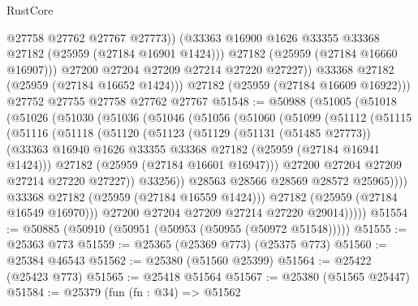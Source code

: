 \begin{lexlean}{RustCore}
\begin{coremodule}
                  @27758
                  @27762
                  @27767
                  @27773))
              (@33363 @16900 @1626 @33355 @33368 @27182 (@25959 (@27184 @16901 @1424)))
              @27182
              (@25959 (@27184 @16660 @16907)))
            @27200
            @27204
            @27209
            @27214
            @27220
            @27227))
        @33368
        @27182
        (@25959 (@27184 @16652 @1424)))
      @27182
      (@25959 (@27184 @16609 @16922)))
    @27752
    @27755
    @27758
    @27762
    @27767
@51548 := @50988
    (@51005
      (@51018
        (@51026
          (@51030
            (@51036
              (@51046
                (@51056
                  (@51060
                    (@51099
                      (@51112
                        (@51115
                          (@51116
                            (@51118
                              (@51120
                                (@51123
                                  (@51129
                                    (@51131 (@51485 @27773))
                                    (@33363
                                      @16940
                                      @1626
                                      @33355
                                      @33368
                                      @27182
                                      (@25959 (@27184 @16941 @1424)))
                                    @27182
                                    (@25959 (@27184 @16601 @16947)))
                                  @27200
                                  @27204
                                  @27209
                                  @27214
                                  @27220
                                  @27227))
                              @33256))
                          @28563
                          @28566
                          @28569
                          @28572
                          @25965))))
                  @33368
                  @27182
                  (@25959 (@27184 @16559 @1424)))
                @27182
                (@25959 (@27184 @16549 @16970)))
              @27200
              @27204
              @27209
              @27214
              @27220
              @29014)))))
@51554 := @50885 (@50910 (@50951 (@50953 (@50955 (@50972 @51548)))))
@51555 := @25363 @773
@51559 := @25365 (@25369 @773) (@25375 @773)
@51560 := @25384 @46543
@51562 := @25380 (@51560 @25399)
@51564 := @25422 (@25423 @773)
@51565 := @25418 @51564
@51567 := @25380 (@51565 @25447)
@51584 := @25379
    (fun (fn : @34) =>
    @51562

\end{coremodule}
\end{lexlean}
